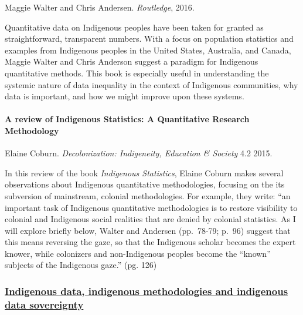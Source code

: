 \documentclass[
]{book}
\begin{document}
Maggie Walter and Chris Andersen. \emph{Routledge}, 2016.

Quantitative data on Indigenous peoples have been taken for granted as straightforward, transparent numbers. With a focus on population statistics and examples from Indigenous peoples in the United States, Australia, and Canada, Maggie Walter and Chris Anderson suggest a paradigm for Indigenous quantitative methods. This book is especially useful in understanding the systemic nature of data inequality in the context of Indigenous communities, why data is important, and how we might improve upon these systems.

\hypertarget{a-review-of-indigenous-statistics-a-quantitative-research-methodology}{%
\paragraph*{A review of Indigenous Statistics: A Quantitative Research Methodology}\label{a-review-of-indigenous-statistics-a-quantitative-research-methodology}}

Elaine Coburn. \emph{Decolonization: Indigeneity, Education \& Society} 4.2 2015.

In this review of the book \emph{Indigenous Statistics}, Elaine Coburn makes several observations about Indigenous quantitative methodologies, focusing on the its subversion of mainstream, colonial methodologies. For example, they write: ``an important task of Indigenous quantitative methodologies is to restore visibility to colonial and Indigenous social realities that are denied by colonial statistics. As I will explore briefly below, Walter and Andersen (pp.~78-79; p.~96) suggest that this means reversing the gaze, so that the Indigenous scholar becomes the expert knower, while colonizers and non-Indigenous peoples become the ``known'' subjects of the Indigenous gaze.'' (pg. 126)

\hypertarget{indigenous-data-indigenous-methodologies-and-indigenous-data-sovereignty}{%
\subsubsection*{\texorpdfstring{\href{https://www.tandfonline.com/doi/full/10.1080/13645579.2018.1531228}{Indigenous data, indigenous methodologies and indigenous data sovereignty}}{Indigenous data, indigenous methodologies and indigenous data sovereignty}}\label{indigenous-data-indigenous-methodologies-and-indigenous-data-sovereignty}}
\end{document}
